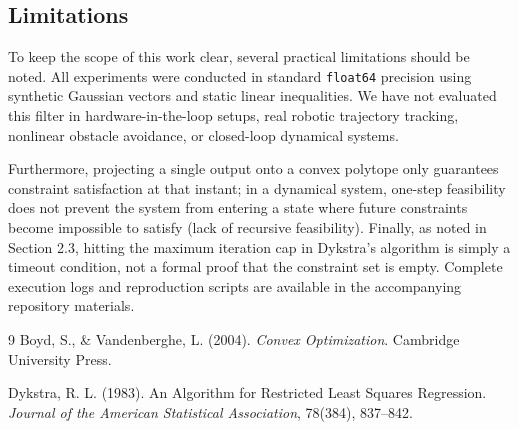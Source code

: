 \documentclass[11pt,a4paper]{article}
\begin{document}
\subsection{Limitations}
To keep the scope of this work clear, several practical limitations should be noted. All experiments were conducted in standard \texttt{float64} precision using synthetic Gaussian vectors and static linear inequalities. We have not evaluated this filter in hardware-in-the-loop setups, real robotic trajectory tracking, nonlinear obstacle avoidance, or closed-loop dynamical systems.

Furthermore, projecting a single output onto a convex polytope only guarantees constraint satisfaction at that instant; in a dynamical system, one-step feasibility does not prevent the system from entering a state where future constraints become impossible to satisfy (lack of recursive feasibility). Finally, as noted in Section 2.3, hitting the maximum iteration cap in Dykstra's algorithm is simply a timeout condition, not a formal proof that the constraint set is empty. Complete execution logs and reproduction scripts are available in the accompanying repository materials.

\begin{thebibliography}{9}
Boyd, S., \& Vandenberghe, L. (2004). \emph{Convex Optimization}. Cambridge University Press.

Dykstra, R. L. (1983). An Algorithm for Restricted Least Squares Regression. \emph{Journal of the American Statistical Association}, 78(384), 837--842.
\end{thebibliography}
\end{document}
